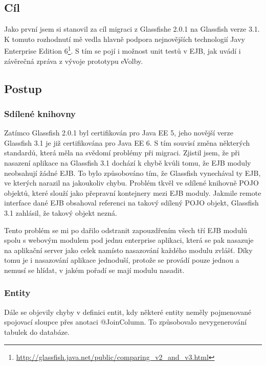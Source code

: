 \documentclass[11pt,twoside,a4paper]{book}
\begin{document}
\subsection{Cíl}

Jako první jsem si stanovil za cíl migraci z Glassfishe 2.0.1 na Glassfish verze 3.1. K tomuto rozhodnutí mě vedla hlavně podpora nejnovějších technologií Javy Enterprise Edition 6\footnote{\url{http://glassfish.java.net/public/comparing_v2_and_v3.html}}. S tím se pojí i možnost unit testů v EJB, jak uvádí i závěrečná zpráva z vývoje prototypu eVolby\cite{www:prototyp}.

\subsection{Postup}

\subsubsection{Sdílené knihovny}

Zatímco Glassfish 2.0.1 byl certifikován pro Java EE 5, jeho novější verze Glassfish 3.1 je již certifikována pro Java EE 6. S tím souvisí změna některých standardů, která měla na svědomí problémy při migraci. Zjistil jsem, že při nasazení aplikace na Glassfish 3.1 dochází k chybě kvůli tomu, že EJB moduly neobsahují žádné EJB. To bylo způsobováno tím, že Glassfish vynechával ty EJB, ve kterých narazil na jakoukoliv chybu. Problém tkvěl ve sdílené knihovně POJO objektů, které slouží jako přepravní kontejnery mezi EJB moduly. Jakmile remote interface dané EJB obsahoval referenci na takový sdílený POJO objekt, Glassfish 3.1 zahlásil, že takový objekt nezná.

Tento problém se mi po dařilo odstranit zapouzdřením všech tří EJB modulů spolu s webovým modulem pod jednu enterprise aplikaci, která se pak nasazuje na aplikační server jako celek namísto nasazování každého modulu zvlášť. Díky tomu je i nasazování aplikace jednoduší, protože se provádí pouze jednou a nemusí se hlídat, v jakém pořadí se mají modulu nasadit.

\subsubsection{Entity}

Dále se objevily chyby v definici entit, kdy některé entity neměly pojmenované spojovací sloupce přes anotaci @JoinColumn. To způsobovalo nevygenerování tabulek do databáze.
\end{document}
